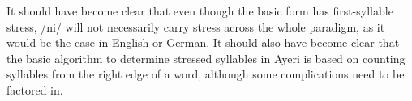 It should have become clear that even though the basic form  
has first-syllable stress, /ni/ will not necessarily carry stress across the 
whole paradigm, as it would be the case in English or German. It should also 
have become clear that the basic algorithm to determine stressed syllables in 
Ayeri is based on counting syllables from the right edge of a word, although 
some complications need to be factored in.
